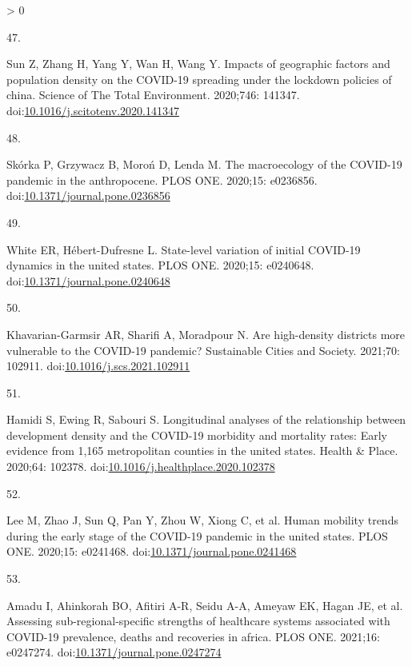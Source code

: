 \documentclass[10pt,letterpaper]{article}
\newlength{\csllabelwidth}
\newlength{\cslhangindent}
\newenvironment{CSLReferences}[3] %
 {%
  \setlength{\parindent}{0pt}
  \ifodd #1 \everypar{\setlength{\hangindent}{\cslhangindent}}\ignorespaces\fi
  \ifnum #2 > 0
  \setlength{\parskip}{#2\baselineskip}
  \fi
 }%
 {}
\newcommand{\CSLLeftMargin}[1]{\parbox[t]{\csllabelwidth}{#1}}
\newcommand{\CSLRightInline}[1]{\parbox[t]{\linewidth - \csllabelwidth}{#1}}
\begin{document}
\begin{CSLReferences}{0}{0}
\leavevmode\hypertarget{ref-Sun2020impacts}{}%
\CSLLeftMargin{47. }
\CSLRightInline{Sun Z, Zhang H, Yang Y, Wan H, Wang Y. Impacts of
geographic factors and population density on the COVID-19 spreading
under the lockdown policies of china. Science of The Total Environment.
2020;746: 141347.
doi:\href{https://doi.org/10.1016/j.scitotenv.2020.141347}{10.1016/j.scitotenv.2020.141347}}

\leavevmode\hypertarget{ref-Skorka2020macroecology}{}%
\CSLLeftMargin{48. }
\CSLRightInline{Skórka P, Grzywacz B, Moroń D, Lenda M. The macroecology
of the COVID-19 pandemic in the anthropocene. PLOS ONE. 2020;15:
e0236856.
doi:\href{https://doi.org/10.1371/journal.pone.0236856}{10.1371/journal.pone.0236856}}

\leavevmode\hypertarget{ref-White2020state}{}%
\CSLLeftMargin{49. }
\CSLRightInline{White ER, Hébert-Dufresne L. State-level variation of
initial COVID-19 dynamics in the united states. PLOS ONE. 2020;15:
e0240648.
doi:\href{https://doi.org/10.1371/journal.pone.0240648}{10.1371/journal.pone.0240648}}

\leavevmode\hypertarget{ref-Khavarian2021high}{}%
\CSLLeftMargin{50. }
\CSLRightInline{Khavarian-Garmsir AR, Sharifi A, Moradpour N. Are
high-density districts more vulnerable to the COVID-19 pandemic?
Sustainable Cities and Society. 2021;70: 102911.
doi:\href{https://doi.org/10.1016/j.scs.2021.102911}{10.1016/j.scs.2021.102911}}

\leavevmode\hypertarget{ref-Hamidi2020longitudinal}{}%
\CSLLeftMargin{51. }
\CSLRightInline{Hamidi S, Ewing R, Sabouri S. Longitudinal analyses of
the relationship between development density and the COVID-19 morbidity
and mortality rates: Early evidence from 1,165 metropolitan counties in
the united states. Health \& Place. 2020;64: 102378.
doi:\href{https://doi.org/10.1016/j.healthplace.2020.102378}{10.1016/j.healthplace.2020.102378}}

\leavevmode\hypertarget{ref-Lee2020human}{}%
\CSLLeftMargin{52. }
\CSLRightInline{Lee M, Zhao J, Sun Q, Pan Y, Zhou W, Xiong C, et al.
Human mobility trends during the early stage of the COVID-19 pandemic in
the united states. PLOS ONE. 2020;15: e0241468.
doi:\href{https://doi.org/10.1371/journal.pone.0241468}{10.1371/journal.pone.0241468}}

\leavevmode\hypertarget{ref-Amadu2021assessing}{}%
\CSLLeftMargin{53. }
\CSLRightInline{Amadu I, Ahinkorah BO, Afitiri A-R, Seidu A-A, Ameyaw
EK, Hagan JE, et al. Assessing sub-regional-specific strengths of
healthcare systems associated with COVID-19 prevalence, deaths and
recoveries in africa. PLOS ONE. 2021;16: e0247274.
doi:\href{https://doi.org/10.1371/journal.pone.0247274}{10.1371/journal.pone.0247274}}


\end{CSLReferences}
\end{document}
